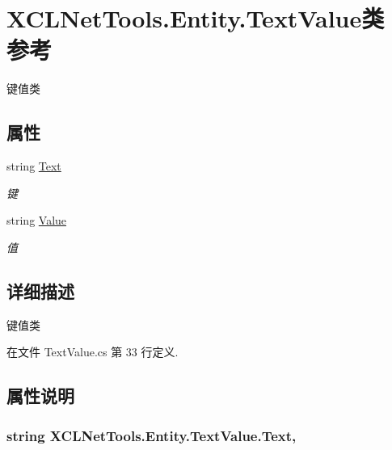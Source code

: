 \hypertarget{class_x_c_l_net_tools_1_1_entity_1_1_text_value}{\section{X\-C\-L\-Net\-Tools.\-Entity.\-Text\-Value类 参考}
\label{class_x_c_l_net_tools_1_1_entity_1_1_text_value}
}


键值类  


\subsection*{属性}
\begin{DoxyCompactItemize}
\item 
string \hyperlink{class_x_c_l_net_tools_1_1_entity_1_1_text_value_a56860ac04aa98fbb3e41e5b451d16c4a}{Text}
\begin{DoxyCompactList}\small\item\em 键 \end{DoxyCompactList}\item 
string \hyperlink{class_x_c_l_net_tools_1_1_entity_1_1_text_value_a8a193486b942adc898433bd29db3eff7}{Value}
\begin{DoxyCompactList}\small\item\em 值 \end{DoxyCompactList}\end{DoxyCompactItemize}


\subsection{详细描述}
键值类 



在文件 Text\-Value.\-cs 第 33 行定义.



\subsection{属性说明}
\hypertarget{class_x_c_l_net_tools_1_1_entity_1_1_text_value_a56860ac04aa98fbb3e41e5b451d16c4a}{
\subsubsection[{Text}]{\setlength{\rightskip}{0pt plus 5cm}string X\-C\-L\-Net\-Tools.\-Entity.\-Text\-Value.\-Text\hspace{0.3cm}{\ttfamily [get]}, {\ttfamily [set]}}}\label{class_x_c_l_net_tools_1_1_entity_1_1_text_value_a56860ac04aa98fbb3e41e5b451d16c4a}


